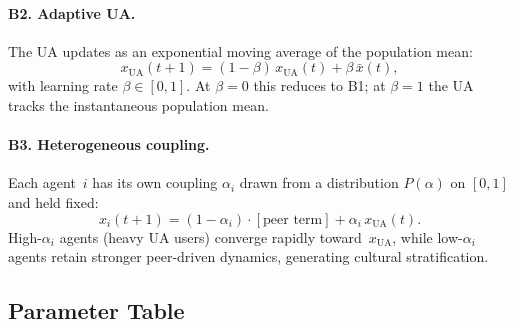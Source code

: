 \documentclass{article}
\theoremstyle{plain}
\theoremstyle{definition}
\theoremstyle{remark}
\newcommand{\xUA}{x_{\mathrm{UA}}}
\newcommand{\xbar}{\bar{x}}
\begin{document}
\paragraph{B2. Adaptive UA.}
The UA updates as an exponential moving average of the population mean:
\begin{equation}
    \xUA(t+1) = (1-\beta)\,\xUA(t) + \beta\,\xbar(t),
    \label{eq:adaptive}
\end{equation}
with learning rate $\beta\in[0,1]$.
At $\beta=0$ this reduces to B1; at $\beta=1$ the UA tracks the
instantaneous population mean.

\paragraph{B3. Heterogeneous coupling.}
Each agent~$i$ has its own coupling $\alpha_i$ drawn from a distribution
$P(\alpha)$ on $[0,1]$ and held fixed:
\begin{equation}
    x_i(t+1) = (1-\alpha_i)\cdot[\text{peer term}] + \alpha_i\,\xUA(t).
    \label{eq:b3}
\end{equation}
High-$\alpha_i$ agents (heavy UA users) converge rapidly toward~$\xUA$,
while low-$\alpha_i$ agents retain stronger peer-driven dynamics,
generating cultural stratification.

\subsection{Parameter Table}
\end{document}
